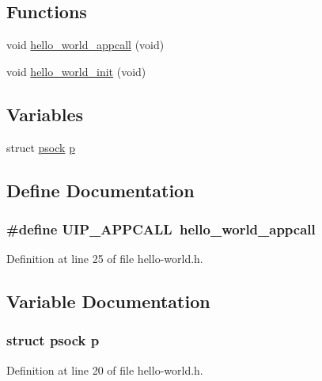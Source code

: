 \subsection*{Functions}
\begin{DoxyCompactItemize}
\item 
void \hyperlink{group__helloworld_ga03070adbf8faab0f34f87c1270964306}{hello\_\-world\_\-appcall} (void)
\item 
void \hyperlink{group__helloworld_gab97849f0d3ea858eee790b69591e6427}{hello\_\-world\_\-init} (void)
\end{DoxyCompactItemize}
\subsection*{Variables}
\begin{DoxyCompactItemize}
\item 
struct \hyperlink{structpsock}{psock} \hyperlink{hello-world_8h_a245c0f47e726cb7b4c2fbe797657505d}{p}
\end{DoxyCompactItemize}


\subsection{Define Documentation}
\hypertarget{hello-world_8h_ae28f6cb60e86088d8886d0f804b4f37c}{
\subsubsection[{UIP\_\-APPCALL}]{\setlength{\rightskip}{0pt plus 5cm}\#define UIP\_\-APPCALL~hello\_\-world\_\-appcall}}
\label{hello-world_8h_ae28f6cb60e86088d8886d0f804b4f37c}


Definition at line 25 of file hello-\/world.h.



\subsection{Variable Documentation}
\hypertarget{hello-world_8h_a245c0f47e726cb7b4c2fbe797657505d}{
\subsubsection[{p}]{\setlength{\rightskip}{0pt plus 5cm}struct {\bf psock} {\bf p}}}
\label{hello-world_8h_a245c0f47e726cb7b4c2fbe797657505d}


Definition at line 20 of file hello-\/world.h.

